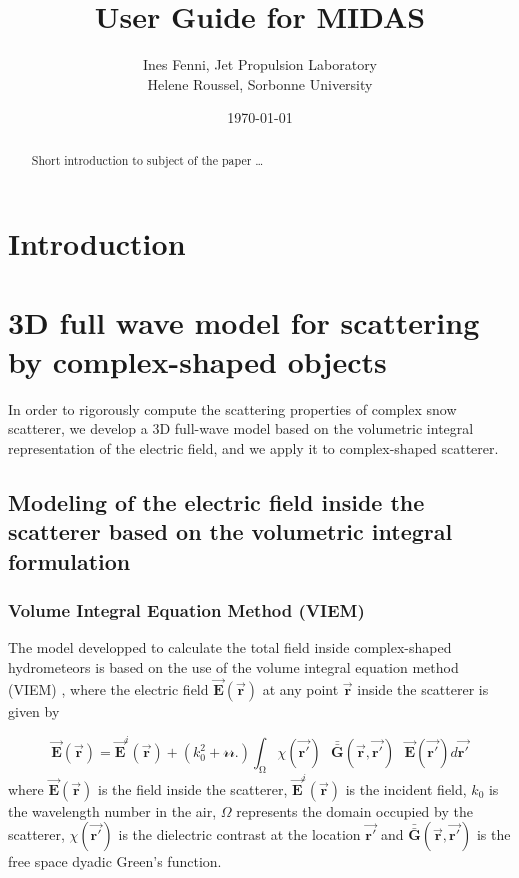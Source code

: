 \documentclass{article}
\title{User Guide for MIDAS}
\author{Ines Fenni, Jet Propulsion Laboratory  \\
	Helene Roussel, Sorbonne University  \\
	}
\date{\today}
\begin{document}
\maketitle


\begin{abstract}
Short introduction to subject of the paper \ldots 
\end{abstract}

\section{Introduction}


\section{3D full wave model for scattering by complex-shaped objects}\label{3D_full_wave_model}
In order to rigorously compute the scattering properties of complex snow scatterer, we develop a 3D full-wave model based on the volumetric integral representation of the electric field, and we apply it to complex-shaped scatterer.

\subsection{Modeling of the electric field inside the scatterer based on the volumetric integral formulation} \label{VIEM-MoM}

\subsubsection{Volume Integral Equation Method (VIEM)}
The model developped to calculate the total field inside complex-shaped hydrometeors is based on the use of the volume integral equation method (VIEM) \cite{Nguyen2006model,Bellez2009model}, where the electric field $\vec{\textbf{E}}(\vec{\textbf{r}})$ at any point $\vec{\textbf{r}}$ inside the scatterer is given by 

%
\begin{equation}
\label{EQ_VIEM}
\vec{\textbf{E}}(\vec{\textbf{r}})= \vec{\textbf{E}}^i(\vec{\textbf{r}}) + (k_0^2 + \mathcal{r}\mathcal{r}.) \mathrm{\int_{\Omega}} \chi(\vec{\textbf{r}'})\text{ } \bar{\bar{\textbf{G}}}(\vec{\textbf{r}},\vec{\textbf{r}'})\text{ }\vec{\textbf{E}}(\vec{\textbf{r}'})d\vec{\textbf{r}'}
\end{equation}
%
where $\vec{\textbf{E}}(\vec{\textbf{r}})$ is the field inside the scatterer, $\vec{\textbf{E}}^i(\vec{\textbf{r}})$ is the incident field, $k_0$ is the wavelength number in the air, $\Omega$ represents the domain occupied by the scatterer, $\chi(\vec{\textbf{r}'})$ is the dielectric contrast at the location $\vec{\textbf{r}'}$ and $\bar{\bar{\textbf{G}}}(\vec{\textbf{r}},\vec{\textbf{r}'})$ is the free space dyadic Green's function.
\end{document}
